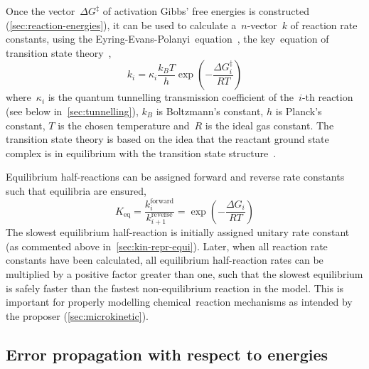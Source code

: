 Once the vector~$\Delta G^\ddagger$ of activation Gibbs' free energies is constructed (\cref{sec:reaction-energies}),
it can be used to calculate a~$n$-vector~$k$ of reaction rate constants,
using the Eyring-Evans-Polanyi~equation~\cite{Eyring_1935,Evans_1935,TransitionStateTheory},
the key~equation of transition state theory~\cite{TransitionStateTheory},
%
\begin{equation}\label{eq:rate-consts}
	k_i = \kappa_i \frac{k_B T}{h}
	\exp \left(-\frac{\Delta G_i^\ddagger}{R T} \right)
\end{equation}
%
where~$\kappa_i$ is the quantum tunnelling transmission coefficient of the~$i$-th reaction (see below in~\cref{sec:tunnelling}),
$k_B$ is Boltzmann's constant,
$h$ is Planck's constant,
$T$ is the chosen temperature and~$R$ is the ideal gas constant.
The transition state theory is based on the idea that the reactant ground state complex is in equilibrium with the transition state structure~\cite{TransitionStateTheory}.

Equilibrium half-reactions can be assigned forward and reverse rate constants such that equilibria are ensured,
%
\begin{equation}
	K_\text{eq}
	= \frac{k_i^\text{forward}}{k_{i + 1}^\text{reverse}}
	= \exp \left(-\frac{\Delta G_i}{R T} \right)
\end{equation}
%
The slowest equilibrium half-reaction is initially assigned unitary rate constant (as commented above in~\cref{sec:kin-repr-equi}).
Later,
when all reaction rate constants have been calculated,
all equilibrium half-reaction rates can be multiplied by a positive factor greater than one,
such that the slowest equilibrium is safely faster than the fastest non-equilibrium reaction in the model.
This is important for properly modelling chemical~reaction mechanisms as intended by the proposer (\cref{sec:microkinetic}).

\subsection{Error propagation with respect to energies}%
\label{sec:rates-error-prop}

